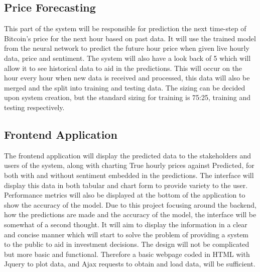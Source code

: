 \documentclass[oneside, 12pt]{article}
\begin{document}
		\subsection{Price Forecasting}
		This part of the system will be responsible for prediction the next time-step of Bitcoin's price for the next hour based on past data. It will use the trained model from the neural network to predict the future hour price when given live hourly data, price and sentiment. The system will also have a look back of 5 which will allow it to see historical data to aid in the predictions. This will occur on the hour every hour when new data is received and processed, this data will also be merged and the split into training and testing data. The sizing can be decided upon system creation, but the standard sizing for training is 75:25, training and testing respectively.
		
		\subsection{Frontend Application}
		The frontend application will display the predicted data to the stakeholders and users of the system, along with charting True hourly prices against Predicted, for both with and without sentiment embedded in the predictions. The interface will display this data in both tabular and chart form to provide variety to the user. Performance metrics will also be displayed at the bottom of the application to show the accuracy of the model. Due to this project focusing around the backend, how the predictions are made and the accuracy of the model, the interface will be somewhat of a second thought. It will aim to display the information in a clear and concise manner which will start to solve the problem of providing a system to the public to aid in investment decisions. The design will not be complicated but more basic and functional. Therefore a basic webpage coded in HTML with Jquery to plot data, and Ajax requests to obtain and load data, will be sufficient.
	
\end{document}

